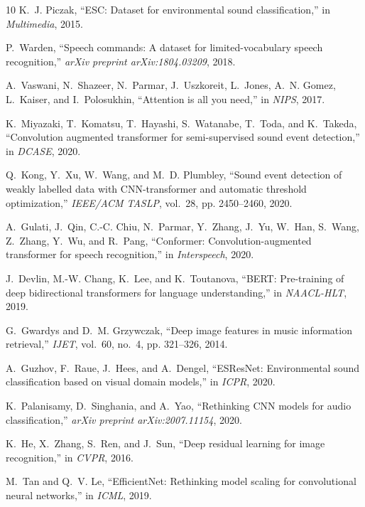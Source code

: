 \documentclass[a4paper]{article}
\begin{document}
\begin{thebibliography}{10}
K.~J. Piczak, ``{ESC}: Dataset for environmental sound classification,'' in
  \emph{Multimedia}, 2015.

P.~Warden, ``Speech commands: A dataset for limited-vocabulary speech
  recognition,'' \emph{arXiv preprint arXiv:1804.03209}, 2018.

A.~Vaswani, N.~Shazeer, N.~Parmar, J.~Uszkoreit, L.~Jones, A.~N. Gomez,
  L.~Kaiser, and I.~Polosukhin, ``Attention is all you need,'' in \emph{NIPS},
  2017.

K.~Miyazaki, T.~Komatsu, T.~Hayashi, S.~Watanabe, T.~Toda, and K.~Takeda,
  ``Convolution augmented transformer for semi-supervised sound event
  detection,'' in \emph{DCASE}, 2020.

Q.~Kong, Y.~Xu, W.~Wang, and M.~D. Plumbley, ``Sound event detection of weakly
  labelled data with {CNN}-transformer and automatic threshold optimization,''
  \emph{IEEE/ACM TASLP}, vol.~28, pp. 2450--2460, 2020.

A.~Gulati, J.~Qin, C.-C. Chiu, N.~Parmar, Y.~Zhang, J.~Yu, W.~Han, S.~Wang,
  Z.~Zhang, Y.~Wu, and R.~Pang, ``Conformer: Convolution-augmented transformer
  for speech recognition,'' in \emph{Interspeech}, 2020.

J.~Devlin, M.-W. Chang, K.~Lee, and K.~Toutanova, ``{BERT}: Pre-training of
  deep bidirectional transformers for language understanding,'' in
  \emph{NAACL-HLT}, 2019.

G.~Gwardys and D.~M. Grzywczak, ``Deep image features in music information
  retrieval,'' \emph{IJET}, vol.~60, no.~4, pp. 321--326, 2014.

A.~Guzhov, F.~Raue, J.~Hees, and A.~Dengel, ``{ESResNet}: Environmental sound
  classification based on visual domain models,'' in \emph{ICPR}, 2020.

K.~Palanisamy, D.~Singhania, and A.~Yao, ``Rethinking {CNN} models for audio
  classification,'' \emph{arXiv preprint arXiv:2007.11154}, 2020.

K.~He, X.~Zhang, S.~Ren, and J.~Sun, ``Deep residual learning for image
  recognition,'' in \emph{CVPR}, 2016.

M.~Tan and Q.~V. Le, ``{EfficientNet}: Rethinking model scaling for
  convolutional neural networks,'' in \emph{ICML}, 2019.


\end{thebibliography}
\end{document}
